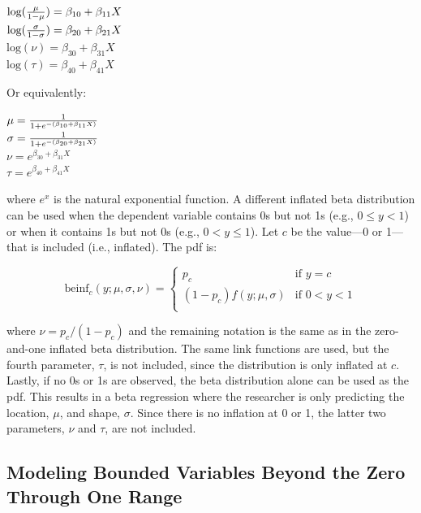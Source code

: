 \documentclass[english,man]{apa6}
\theoremstyle{definition}
\theoremstyle{definition}
\theoremstyle{remark}
\begin{document}
\begin{center}
$\text{log}({\mu \over 1 - \mu}) = \beta_{10} + \beta_{11}X$\\
$\text{log}({\sigma \over 1 - \sigma}) = \beta_{20} + \beta_{21}X$\\
$\text{log}(\nu) = \beta_{30} + \beta_{31}X$\\
$\text{log}(\tau) = \beta_{40} + \beta_{41}X$
\end{center}

Or equivalently:

\begin{center}
$\mu={1\over1+e^{-(\beta_{10}+\beta_{11}X)}}$\\
$\sigma={1\over1+e^{-(\beta_{20}+\beta_{21}X)}}$\\
$\nu = e^{\beta_{30} + \beta_{31}X}$\\
$\tau = e^{\beta_{40} + \beta_{41}X}$
\end{center}

where \(e^x\) is the natural exponential function. A different inflated
beta distribution can be used when the dependent variable contains 0s
but not 1s (e.g., \(0 \leq y < 1\)) or when it contains 1s but not 0s
(e.g., \(0 < y \leq 1\)). Let \(c\) be the value---0 or 1---that is
included (i.e., inflated). The pdf is:

\begin{center}
\[
\text{beinf}_c(y;\mu,\sigma,\nu) =
\begin{cases}
  p_c                             & \text{if } y = c\\
  (1 - p_c)f(y;\mu,\sigma)        & \text{if } 0 < y < 1\\
\end{cases}
\]
\end{center}

where \(\nu = p_c / (1 - p_c)\) and the remaining notation is the same
as in the zero-and-one inflated beta distribution. The same link
functions are used, but the fourth parameter, \(\tau\), is not included,
since the distribution is only inflated at \(c\). Lastly, if no 0s or 1s
are observed, the beta distribution alone can be used as the pdf. This
results in a beta regression where the researcher is only predicting the
location, \(\mu\), and shape, \(\sigma\). Since there is no inflation at
0 or 1, the latter two parameters, \(\nu\) and \(\tau\), are not
included.

\subsection{Modeling Bounded Variables Beyond the Zero Through One
Range}\label{modeling-bounded-variables-beyond-the-zero-through-one-range}
\end{document}
